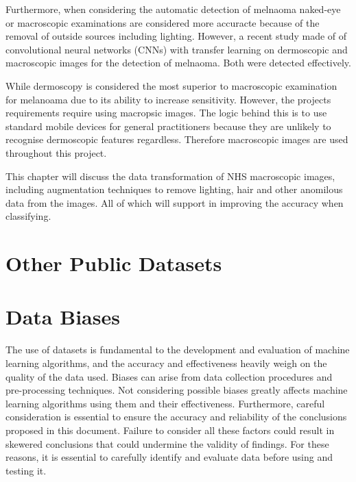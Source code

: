 Furthermore, when considering the automatic detection of melnaoma naked-eye or macroscopic examinations are considered more accuracte because of the removal of outside sources including lighting. However, a recent study made of of convolutional neural networks (CNNs) with transfer learning on dermoscopic and macroscopic images for the detection of melnaoma\cite{Millenia et al., 2022}. Both were detected effectively.

While dermoscopy is considered the most superior to macroscopic examination for melanoama due to its ability to increase sensitivity. However, the projects requirements require using macropsic images. The logic behind this is to use standard mobile devices for general practitioners because they are unlikely to recognise dermoscopic features regardless. Therefore macroscopic images are used throughout this project.

This chapter will discuss the data transformation of NHS macroscopic images, including augmentation techniques to remove lighting, hair and other anomilous data from the images. All of which will support in improving the accuracy when classifying.



\section{Other Public Datasets}

\section{Data Biases}
The use of datasets is fundamental to the development and evaluation of machine learning algorithms, and the accuracy and effectiveness heavily weigh on the quality of the data used. Biases can arise from data collection procedures and pre-processing techniques. Not considering possible biases greatly affects machine learning algorithms using them and their effectiveness. Furthermore, careful consideration is essential to ensure the accuracy and reliability of the conclusions proposed in this document. Failure to consider all these factors could result in skewered conclusions that could undermine the validity of findings. For these reasons, it is essential to carefully identify and evaluate data before using and testing it.

